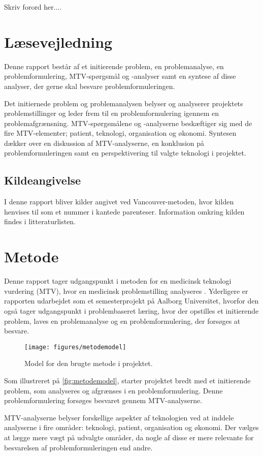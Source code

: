 Skriv forord her.... 


\section{Læsevejledning}
Denne rapport består af et initierende problem, en problemanalyse, en problemformulering, MTV-spørgsmål og -analyser samt en syntese af disse analyser, der gerne skal besvare problemformuleringen. 

Det initiernede problem og problemanalysen belyser og analyserer projektets problemstillinger og leder frem til en problemformulering igennem en problemafgrænsning. MTV-spørgsmålene og -analyserne beskæftiger sig med de fire MTV-elementer; patient, teknologi, organisation og økonomi. Syntesen dækker over en diskussion af MTV-analyserne, en konklusion på problemformuleringen samt en perspektivering til valgte teknologi i projektet. 


\subsection{Kildeangivelse}
I denne rapport bliver kilder angivet ved Vancouver-metoden, hvor kilden henvises til som et nummer i kantede parenteser. Information omkring kilden findes i litteraturlisten.

\section{Metode} %
Denne rapport tager udgangspunkt i metoden for en medicinsk teknologi vurdering (MTV), hvor en medicinsk problemstilling analyseres \citep{mtvhaandbog}. Yderligere er rapporten udarbejdet som et semesterprojekt på Aalborg Universitet, hvorfor den også tager udgangspunkt i problembaseret læring, hvor der opstilles et initierende problem, laves en problemanalyse og en problemformulering, der forsøges at besvare. 


\begin{figure}[H]
	\centering
	\texttt{[image: figures/metodemodel]}
	\caption{Model for den brugte metode i projektet.}
	\label{fig:metodemodel}
\end{figure}

\noindent
Som illustreret på \autoref{fig:metodemodel}, starter projektet bredt med et initierende problem, som analyseres og afgrænses i en problemformulering. Denne problemformulering forsøges besvaret gennem MTV-analyserne. 

MTV-analyserne belyser forskellige aspekter af teknologien ved at inddele analyserne i fire områder: teknologi, patient, organisation og økonomi. Der vælges at lægge mere vægt på udvalgte områder, da nogle af disse er mere relevante for besvarelsen af problemformuleringen end andre. 

